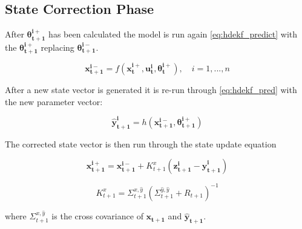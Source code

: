 \subsection{State Correction Phase}

After $\mathbf{\theta_{t+1}^{i+}}$ has been calculated the model is run again \eqref{eq:hdekf_predict} with the $\mathbf{\theta_{t+1}^{i+}}$ replacing $\mathbf{\theta_{t+1}^{i-}}$.

\begin{equation}\label{eq:hdekf_predict_2}
\mathbf{x_{t+1}^{i-}} = f(\mathbf{x_{t}^{i+}}, \mathbf{u_{t}^{i}}, \mathbf{\theta^{i+}_{t}}), \quad i=1,...,n
\end{equation}

After a new state vector is generated it is re-run through \eqref{eq:hdekf_pred} with the new parameter vector:

\begin{equation}\label{eq:hdekf_pred_2}
\mathbf{\hat{y}_{t+1}^{i}} = h(\mathbf{x_{t+1}^{i-}}, \mathbf{\theta_{t+1}^{i+}})
\end{equation}

The corrected state vector is then run through the state update equation

\begin{equation}\label{eq:hdekf_state_update}
\mathbf{x_{t+1}^{i+}} = \mathbf{x_{t+1}^{i-}} + K_{t+1}^{x}(\mathbf{z_{t+1}^{i}}-\mathbf{\hat{y}_{t+1}^{i}})
\end{equation}
 
\begin{equation}\label{eq:hdekf_param_k}
K_{t+1}^{x} = \Sigma^{x,\hat{y}}_{t+1}(\Sigma^{\hat{y},\hat{y}}_{t+1} + R_{t+1})^{-1}
\end{equation}

where $\Sigma^{x,\hat{y}}_{t+1}$ is the cross covariance of $\mathbf{x_{t+1}}$ and $\mathbf{\hat{y}_{t+1}}$.




